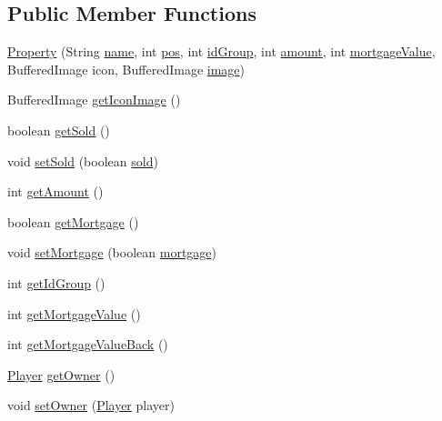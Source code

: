\subsection*{Public Member Functions}
\begin{DoxyCompactItemize}
\item 
\hyperlink{class_monopoly_1_1_logic_1_1_property_a866f0878a2593c56b73e9d0ee6ad37ee}{Property} (String \hyperlink{class_monopoly_1_1_logic_1_1_board_box_ad5cd8d9fc191dc2df82b9fe7766210fd}{name}, int \hyperlink{class_monopoly_1_1_logic_1_1_board_box_a750c8300a134809e0eb5772b3ba92258}{pos}, int \hyperlink{class_monopoly_1_1_logic_1_1_property_ab42a31cd99e909728aa49c0184f644b8}{id\+Group}, int \hyperlink{class_monopoly_1_1_logic_1_1_property_a3e5525c94c56e900372c5a13a8fe03fb}{amount}, int \hyperlink{class_monopoly_1_1_logic_1_1_property_ae4b874ede5de05f1f5b0ab329c2c58f5}{mortgage\+Value}, Buffered\+Image icon, Buffered\+Image \hyperlink{class_monopoly_1_1_logic_1_1_board_box_a7d9f613b72c69740867388b59649d127}{image})
\item 
Buffered\+Image \hyperlink{class_monopoly_1_1_logic_1_1_property_af17e5d11794e3e4ba771937770e11719}{get\+Icon\+Image} ()
\item 
boolean \hyperlink{class_monopoly_1_1_logic_1_1_property_a05b0db4aa4277052557b4fbb3ef6892d}{get\+Sold} ()
\item 
void \hyperlink{class_monopoly_1_1_logic_1_1_property_aee35f29d3931bd143002c5746ebef4a1}{set\+Sold} (boolean \hyperlink{class_monopoly_1_1_logic_1_1_property_a3a3b93ad91c78c5fc0ffd6f5bfbdad1b}{sold})
\item 
int \hyperlink{class_monopoly_1_1_logic_1_1_property_ad64f0164856581418e9a86bfc0cbc76a}{get\+Amount} ()
\item 
boolean \hyperlink{class_monopoly_1_1_logic_1_1_property_a3d90a3b32b39ff03e6902ee8b4e9eb9c}{get\+Mortgage} ()
\item 
void \hyperlink{class_monopoly_1_1_logic_1_1_property_af0cc92f2e23e67f1333035047e4abc89}{set\+Mortgage} (boolean \hyperlink{class_monopoly_1_1_logic_1_1_property_acedac56746517571ae6b1a1f2664bae8}{mortgage})
\item 
int \hyperlink{class_monopoly_1_1_logic_1_1_property_ab38c4860d9510be25024866bc68ee0f0}{get\+Id\+Group} ()
\item 
int \hyperlink{class_monopoly_1_1_logic_1_1_property_a6527ca71594ce7cbb1ca6771dc21abef}{get\+Mortgage\+Value} ()
\item 
int \hyperlink{class_monopoly_1_1_logic_1_1_property_a35a2b515849b4a5fc4d71611ae568e4a}{get\+Mortgage\+Value\+Back} ()
\item 
\hyperlink{class_monopoly_1_1_logic_1_1_player}{Player} \hyperlink{class_monopoly_1_1_logic_1_1_property_a7090f5002c44914c9627e981c9b89f29}{get\+Owner} ()
\item 
void \hyperlink{class_monopoly_1_1_logic_1_1_property_ac6e461d07647fd835bc3089e1ab6f614}{set\+Owner} (\hyperlink{class_monopoly_1_1_logic_1_1_player}{Player} player)
\end{DoxyCompactItemize}
